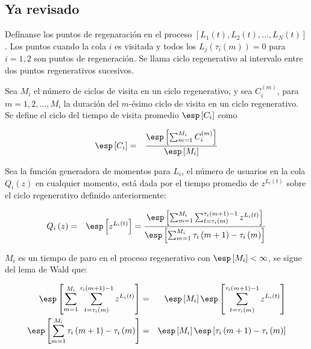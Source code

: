 \subsection{Ya revisado}


Def\'inanse los puntos de regenaraci\'on  en el proceso $\left[L_{1}\left(t\right),L_{2}\left(t\right),\ldots,L_{N}\left(t\right)\right]$. Los puntos cuando la cola $i$ es visitada y todos los $L_{j}\left(\tau_{i}\left(m\right)\right)=0$ para $i=1,2$  son puntos de regeneraci\'on. Se llama ciclo regenerativo al intervalo entre dos puntos regenerativos sucesivos.

Sea $M_{i}$  el n\'umero de ciclos de visita en un ciclo regenerativo, y sea $C_{i}^{(m)}$, para $m=1,2,\ldots,M_{i}$ la duraci\'on del $m$-\'esimo ciclo de visita en un ciclo regenerativo. Se define el ciclo del tiempo de visita promedio $\esp\left[C_{i}\right]$ como

\begin{eqnarray*}
\esp\left[C_{i}\right]&=&\frac{\esp\left[\sum_{m=1}^{M_{i}}C_{i}^{(m)}\right]}{\esp\left[M_{i}\right]}
\end{eqnarray*}




Sea la funci\'on generadora de momentos para $L_{i}$, el n\'umero de usuarios en la cola $Q_{i}\left(z\right)$ en cualquier momento, est\'a dada por el tiempo promedio de $z^{L_{i}\left(t\right)}$ sobre el ciclo regenerativo definido anteriormente:

\begin{eqnarray*}
Q_{i}\left(z\right)&=&\esp\left[z^{L_{i}\left(t\right)}\right]=\frac{\esp\left[\sum_{m=1}^{M_{i}}\sum_{t=\tau_{i}\left(m\right)}^{\tau_{i}\left(m+1\right)-1}z^{L_{i}\left(t\right)}\right]}{\esp\left[\sum_{m=1}^{M_{i}}\tau_{i}\left(m+1\right)-\tau_{i}\left(m\right)\right]}
\end{eqnarray*}

$M_{i}$ es un tiempo de paro en el proceso regenerativo con $\esp\left[M_{i}\right]<\infty$, se sigue del lema de Wald que:


\begin{eqnarray*}
\esp\left[\sum_{m=1}^{M_{i}}\sum_{t=\tau_{i}\left(m\right)}^{\tau_{i}\left(m+1\right)-1}z^{L_{i}\left(t\right)}\right]&=&\esp\left[M_{i}\right]\esp\left[\sum_{t=\tau_{i}\left(m\right)}^{\tau_{i}\left(m+1\right)-1}z^{L_{i}\left(t\right)}\right]\\
\esp\left[\sum_{m=1}^{M_{i}}\tau_{i}\left(m+1\right)-\tau_{i}\left(m\right)\right]&=&\esp\left[M_{i}\right]\esp\left[\tau_{i}\left(m+1\right)-\tau_{i}\left(m\right)\right]
\end{eqnarray*}

